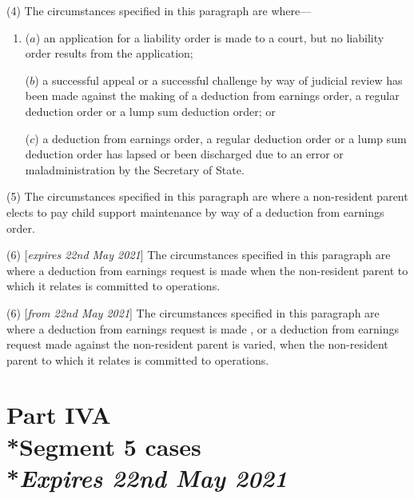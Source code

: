 \documentclass[12pt,a4paper]{article}
\begin{document}
(4) The circumstances specified in this paragraph are where—
\begin{enumerate}\item[]
($a$) an application for a liability order is made to a court, but no liability order results from the application;

($b$) a successful appeal or a successful challenge by way of judicial review has been made against the making of a deduction from earnings order, a regular deduction order or a lump sum deduction order; or

($c$) a deduction from earnings order, a regular deduction order or a lump sum deduction order has lapsed or been discharged due to an error or maladministration by the Secretary of State.
\end{enumerate}

(5) The circumstances specified in this paragraph are where a non-resident parent elects to pay child support maintenance by way of a deduction from earnings order.

(6) [\emph{expires 22nd May 2021}] The circumstances specified in this paragraph are where a deduction from earnings request is made when the non-resident parent to which it relates is committed to operations.

(6) [\emph{from 22nd May 2021}] The circumstances specified in this paragraph are where a deduction from earnings request is made%
, or a deduction from earnings request made against the non-resident parent is varied,  %
when the non-resident parent to which it relates is committed to operations.


    \section[Part IVA --- Segment 5 cases]{Part IVA\\*Segment 5 cases\\*\emph{Expires 22nd May 2021}}

\renewcommand\parthead{--- Part IVA}

\end{document}

